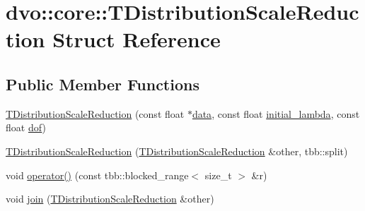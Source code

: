 \hypertarget{structdvo_1_1core_1_1_t_distribution_scale_reduction}{}\section{dvo\+:\+:core\+:\+:T\+Distribution\+Scale\+Reduction Struct Reference}
\label{structdvo_1_1core_1_1_t_distribution_scale_reduction}
\subsection*{Public Member Functions}
\begin{DoxyCompactItemize}
\item 
\mbox{\hyperlink{structdvo_1_1core_1_1_t_distribution_scale_reduction_aa7e02d101f48cc6442918820908efb1c}{T\+Distribution\+Scale\+Reduction}} (const float $\ast$\mbox{\hyperlink{structdvo_1_1core_1_1_t_distribution_scale_reduction_a6259219785a8c3d0419af876182eea8f}{data}}, const float \mbox{\hyperlink{structdvo_1_1core_1_1_t_distribution_scale_reduction_af54018029273dd4a0fded86ace3a6527}{initial\+\_\+lambda}}, const float \mbox{\hyperlink{structdvo_1_1core_1_1_t_distribution_scale_reduction_a351c0ce2b6638b1e0ebd6992d7299feb}{dof}})
\item 
\mbox{\hyperlink{structdvo_1_1core_1_1_t_distribution_scale_reduction_a74f0bb1130ab1e03931cb173d9a0fff9}{T\+Distribution\+Scale\+Reduction}} (\mbox{\hyperlink{structdvo_1_1core_1_1_t_distribution_scale_reduction}{T\+Distribution\+Scale\+Reduction}} \&other, tbb\+::split)
\item 
void \mbox{\hyperlink{structdvo_1_1core_1_1_t_distribution_scale_reduction_a818757987df87f3eeae3b7a3bfda978d}{operator()}} (const tbb\+::blocked\+\_\+range$<$ size\+\_\+t $>$ \&r)
\item 
void \mbox{\hyperlink{structdvo_1_1core_1_1_t_distribution_scale_reduction_a50165f036a45706cd93e36e38a8b04a4}{join}} (\mbox{\hyperlink{structdvo_1_1core_1_1_t_distribution_scale_reduction}{T\+Distribution\+Scale\+Reduction}} \&other)
\end{DoxyCompactItemize}
